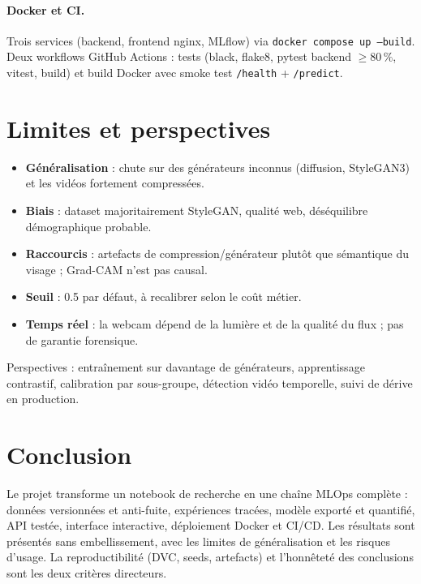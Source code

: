 \documentclass[11pt,a4paper]{article}
\begin{document}
\paragraph{Docker et CI.} Trois services (backend, frontend nginx, MLflow) via
\texttt{docker compose up --build}. Deux workflows GitHub Actions : tests
(black, flake8, pytest backend $\ge 80\,\%$, vitest, build) et build Docker avec
smoke test \texttt{/health} + \texttt{/predict}.

\section{Limites et perspectives}
\begin{itemize}[nosep]
  \item \textbf{Généralisation} : chute sur des générateurs inconnus (diffusion,
        StyleGAN3) et les vidéos fortement compressées.
  \item \textbf{Biais} : dataset majoritairement StyleGAN, qualité web,
        déséquilibre démographique probable.
  \item \textbf{Raccourcis} : artefacts de compression/générateur plutôt que
        sémantique du visage ; Grad-CAM n'est pas causal.
  \item \textbf{Seuil} : 0.5 par défaut, à recalibrer selon le coût métier.
  \item \textbf{Temps réel} : la webcam dépend de la lumière et de la qualité du
        flux ; pas de garantie forensique.
\end{itemize}
Perspectives : entraînement sur davantage de générateurs, apprentissage
contrastif, calibration par sous-groupe, détection vidéo temporelle, suivi de
dérive en production.

\section{Conclusion}
Le projet transforme un notebook de recherche en une chaîne MLOps complète :
données versionnées et anti-fuite, expériences tracées, modèle exporté et
quantifié, API testée, interface interactive, déploiement Docker et CI/CD. Les
résultats sont présentés sans embellissement, avec les limites de généralisation
et les risques d'usage. La reproductibilité (DVC, seeds, artefacts) et
l'honnêteté des conclusions sont les deux critères directeurs.
\end{document}
